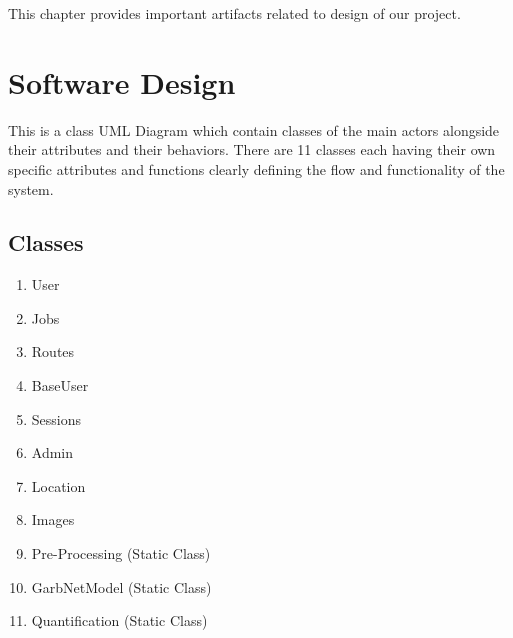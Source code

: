 This chapter provides important artifacts related to design of our project.

\section{Software Design}

This is a class UML Diagram which contain classes of the main actors alongside their attributes and their behaviors. There are 11 classes each having their own specific attributes and functions clearly defining the flow and functionality of the system.
\subsection{Classes}
\begin{enumerate}
    \item  User
    \item  Jobs
    \item  Routes
    \item  BaseUser
    \item  Sessions
    \item  Admin
    \item  Location
    \item  Images
    \item  Pre-Processing  (Static Class)
    \item GarbNetModel    (Static Class)
    \item Quantification  (Static Class)

\end{enumerate}


